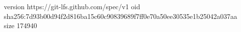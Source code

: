 version https://git-lfs.github.com/spec/v1
oid sha256:7d93b00d94f2d816ba15c60c90839689f7ff0e70a50ee30535e1b25042a037aa
size 174940
